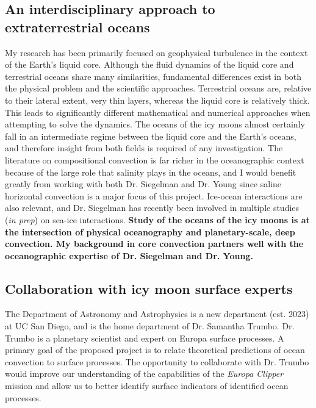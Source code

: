 \documentclass[12pt]{article}
\begin{document}
\subsection{An interdisciplinary approach to extraterrestrial oceans}
My research has been primarily focused on geophysical turbulence in the context of the Earth's liquid core. Although the fluid dynamics of the liquid core and terrestrial oceans share many similarities, fundamental differences exist in both the physical problem and the scientific approaches. Terrestrial oceans are, relative to their lateral extent, very thin layers, whereas the liquid core is relatively thick. This leads to significantly different mathematical and numerical approaches when attempting to solve the dynamics.
The oceans of the icy moons almost certainly fall in an intermediate regime between the liquid core and the Earth's oceans, and therefore insight from both fields is required of any investigation. The literature on compositional convection is far richer in the oceanographic context because of the large role that salinity plays in the oceans, and I would benefit greatly from working with both Dr. Siegelman and Dr. Young since saline horizontal convection is a major focus of this project. 
Ice-ocean interactions are also relevant, and Dr. Siegelman has recently been involved in multiple studies (\textit{in prep}) on sea-ice interactions. 
\textbf{Study of the oceans of the icy moons is at the intersection of physical oceanography and planetary-scale, deep convection. My background in core convection partners well with the oceanographic expertise of Dr. Siegelman and Dr. Young.}

\subsection{Collaboration with icy moon surface experts}
The Department of Astronomy and Astrophysics is a new department (est. 2023) at UC San Diego, and is the home department of Dr. Samantha Trumbo. Dr. Trumbo is a planetary scientist and expert on Europa surface processes. 
A primary goal of the proposed project is to relate theoretical predictions of ocean convection to surface processes. The opportunity to collaborate with Dr. Trumbo would improve our understanding of the capabilities of the \textit{Europa Clipper} mission and allow us to better identify surface indicators of identified ocean processes.
\end{document}
